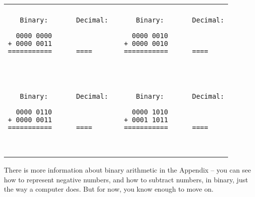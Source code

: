 \begin{tabular}{p{3in} | c  p{3in} }
\hline
\\
\begin{minipage}{2.95in}
\begin{verbatim}
   Binary:       Decimal:

  0000 0000
+ 0000 0011
===========      ====

___________      ____
\end{verbatim}
\end{minipage}

&&

\begin{minipage}{2.95in}
\begin{verbatim}
   Binary:       Decimal:

  0000 0010
+ 0000 0010
===========      ====

___________      ____
\end{verbatim}
\end{minipage}

\\
\hline
\\

\begin{minipage}{2.95in}
\begin{verbatim}
   Binary:       Decimal:

  0000 0110
+ 0000 0011
===========      ====

___________      ____
\end{verbatim}
\end{minipage}

&&

\begin{minipage}{2.95in}
\begin{verbatim}
   Binary:       Decimal:

  0000 1010
+ 0001 1011
===========      ====

___________      ____
\end{verbatim}
\end{minipage}

\\
\hline
\end{tabular}

There is more information about binary arithmetic in the Appendix -- you can see how to represent negative numbers, and how to subtract numbers, in binary, just the way a computer does. But for now, you know enough to move on.
